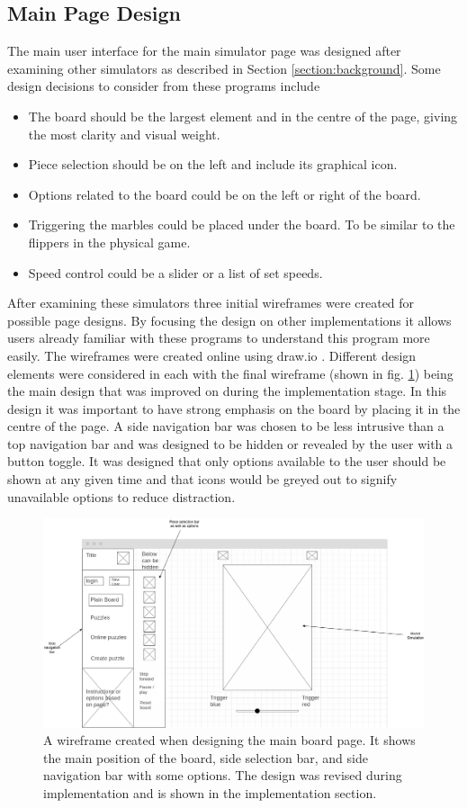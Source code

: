 \documentclass{l4proj}
\begin{document}
\subsection{Main Page Design}
The main user interface for the main simulator page was designed after examining other simulators as described in Section \ref{section:background}. Some design decisions to consider from these programs include
\begin{itemize}
    \item The board should be the largest element and in the centre of the page, giving the most clarity and visual weight.
    \item Piece selection should be on the left and include its graphical icon.
    \item Options related to the board could be on the left or right of the board.
    \item Triggering the marbles could be placed under the board. To be similar to the flippers in the physical game.
    \item Speed control could be a slider or a list of set speeds.
\end{itemize}

After examining these simulators three initial wireframes were created for possible page designs. By focusing the design on other implementations it allows users already familiar with these programs to understand this program more easily. The wireframes were created online using draw.io \citep{noauthor_flowchart_nodate}. Different design elements were considered in each with the final wireframe (shown in fig. \ref{fig:wireframe}) being the main design that was improved on during the implementation stage. In this design it was important to have strong emphasis on the board by placing it in the centre of the page. A side navigation bar was chosen to be less intrusive than a top navigation bar and was designed to be hidden or revealed by the user with a button toggle. It was designed that only options available to the user should be shown at any given time and that icons would be greyed out to signify unavailable options to reduce distraction.


\begin{figure}
    \centering
    \includegraphics[width=0.8\linewidth]{images/wireframe.png}
    \caption{A wireframe created when designing the main board page. It shows the main position of the board, side selection bar, and side navigation bar with some options. The design was revised during implementation and is shown in the implementation section.}
    \label{fig:wireframe}
\end{figure}
\end{document}
